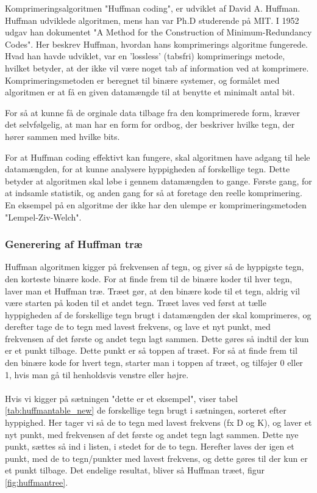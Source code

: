 Komprimeringsalgoritmen "Huffman coding", er udviklet af David A. Huffman. Huffman udviklede algoritmen, mens han var Ph.D studerende på MIT. I 1952 udgav han dokumentet "A Method for the Construction of Minimum-Redundancy Codes"\cite{A_Method_for}. Her beskrev Huffman, hvordan hans komprimerings algoritme fungerede. Hvad han havde udviklet, var en 'lossless' (tabsfri) komprimerings metode, hvilket betyder, at der ikke vil være noget tab af information ved at komprimere. Komprimeringsmetoden er beregnet til binære systemer, og formålet med algoritmen er at få en given datamængde til at benytte et minimalt antal bit. 

For så at kunne få de orginale data tilbage fra den komprimerede form, kræver det selvfølgelig, at man har en form for ordbog, der beskriver hvilke tegn, der hører sammen med hvilke bits.

For at Huffman coding effektivt kan fungere, skal algoritmen have adgang til hele datamængden, for at kunne analysere hyppigheden af forskellige tegn. Dette betyder at algoritmen skal løbe i gennem datamængden to gange. Første gang, for at indsamle statistik, og anden gang for så at foretage den reelle komprimering. En eksempel på en algoritme der ikke har den ulempe er komprimeringsmetoden "Lempel-Ziv-Welch".


\subsubsection{Generering af Huffman træ}
Huffman algoritmen kigger på frekvensen af tegn, og giver så de hyppigste tegn, den korteste binære kode. For at finde frem til de binære koder til hver tegn, laver man et Huffman træ. Træet gør, at den binære kode til et tegn, aldrig vil være starten på koden til et andet tegn. Træet laves ved først at tælle hyppigheden af de forskellige tegn brugt i datamængden der skal komprimeres, og derefter tage de to tegn med lavest frekvens, og lave et nyt punkt, med frekvensen af det første og andet tegn lagt sammen. Dette gøres så indtil der kun er et punkt tilbage. Dette punkt er så toppen af træet. For så at finde frem til den binære kode for hvert tegn, starter man i toppen af træet, og tilføjer 0 eller 1, hvis man gå til henholdsvis venstre eller højre.
\\
\\
Hvis vi kigger på sætningen "dette er et eksempel", viser tabel \ref{tab:huffmantable_new} de forskellige tegn brugt i sætningen, sorteret efter hyppighed. Her tager vi så de to tegn med lavest frekvens (fx D og K), og laver et nyt punkt, med frekvensen af det første og andet tegn lagt sammen. Dette nye punkt, sættes så ind i listen, i stedet for de to tegn. Herefter laves der igen et punkt, med de to tegn/punkter med lavest frekvens, og dette gøres til der kun er et punkt tilbage. Det endelige resultat, bliver så Huffman træet, figur \ref{fig:huffmantree}. 



